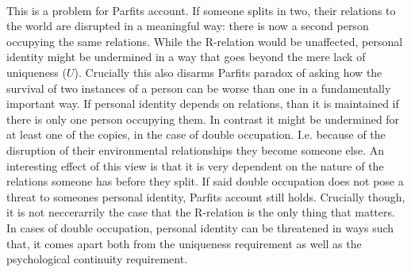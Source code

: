 \documentclass[14pt]{article}
\begin{document}
\\
This is a problem for Parfits account. If someone splits in two, their relations to the world are disrupted in a meaningful way: there is now a second person
occupying the same relations. While the R-relation would be unaffected, personal identity might be undermined in a way that goes beyond the mere lack of uniqueness ($U$). Crucially
this also disarms Parfits paradox of asking how the survival of two instances of a person can be worse than one in a fundamentally important way. If personal identity
depends on relations, than it is maintained if there is only one person occupying them. In contrast it might be undermined for at least one of the copies, in the case of double occupation.
I.e. because of the disruption of their environmental relationships they become someone else.
An interesting effect of this view is that it is very dependent on the nature of the relations someone has before they split. 
If said double occupation does not pose a threat to someones personal identity, Parfits account still holds.
Crucially though, it is not neccerarrily the case that the R-relation is the only thing that matters. In cases of double occupation, personal identity can be threatened
in ways such that, it comes apart both from the uniqueness requirement as well as the psychological continuity requirement.

\printbibliography
\end{document}
